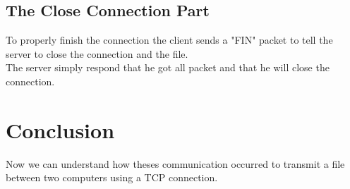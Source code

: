 \documentclass[a4paper]{article}
\begin{document}
\subsection{The Close Connection Part}

To properly finish the connection the client sends a "FIN" packet to tell the server to close the connection and the file.
\\
The server simply respond that he got all packet and that he will close the connection.

\section{Conclusion}

Now we can understand how theses communication occurred to transmit a file between two computers using a TCP connection. 

\newpage
\listoffigures
\end{document}
